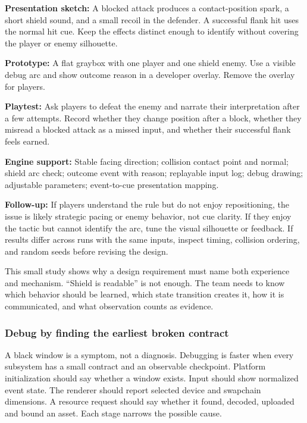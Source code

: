 \textbf{Presentation sketch:} A blocked attack produces a contact-position spark, a short shield sound, and a small recoil in the defender. A successful flank hit uses the normal hit cue. Keep the effects distinct enough to identify without covering the player or enemy silhouette.

\textbf{Prototype:} A flat graybox with one player and one shield enemy. Use a visible debug arc and show outcome reason in a developer overlay. Remove the overlay for players.

\textbf{Playtest:} Ask players to defeat the enemy and narrate their interpretation after a few attempts. Record whether they change position after a block, whether they misread a blocked attack as a missed input, and whether their successful flank feels earned.

\textbf{Engine support:} Stable facing direction; collision contact point and normal; shield arc check; outcome event with reason; replayable input log; debug drawing; adjustable parameters; event-to-cue presentation mapping.

\textbf{Follow-up:} If players understand the rule but do not enjoy repositioning, the issue is likely strategic pacing or enemy behavior, not cue clarity. If they enjoy the tactic but cannot identify the arc, tune the visual silhouette or feedback. If results differ across runs with the same inputs, inspect timing, collision ordering, and random seeds before revising the design.

This small study shows why a design requirement must name both experience and mechanism. ``Shield is readable'' is not enough. The team needs to know which behavior should be learned, which state transition creates it, how it is communicated, and what observation counts as evidence.

\subsubsection{Debug by finding the earliest broken contract}\label{debug-by-finding-the-earliest-broken-contract}

A black window is a symptom, not a diagnosis. Debugging is faster when every subsystem has a small contract and an observable checkpoint. Platform initialization should say whether a window exists. Input should show normalized event state. The renderer should report selected device and swapchain dimensions. A resource request should say whether it found, decoded, uploaded and bound an asset. Each stage narrows the possible cause.

